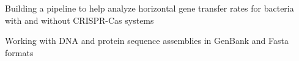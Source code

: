 \begin{cventries}
{\begin{cvitems}
          \item {Building a pipeline to help analyze horizontal gene transfer rates for bacteria with and without CRISPR-Cas systems}
          \item {Working with DNA and protein sequence assemblies in GenBank and Fasta formats}
        \end{cvitems}
      }
\end{cventries}
